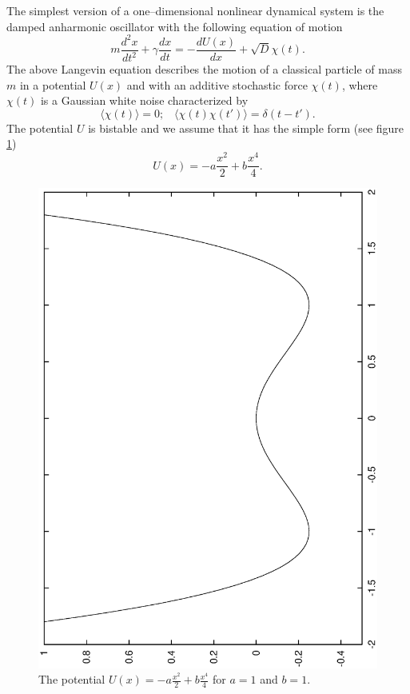 The simplest version of a one--dimensional nonlinear dynamical system 
is the damped anharmonic oscillator with the following equation of motion
\begin{equation}
m \frac{d^2x}{dt^2} + \gamma \frac{dx}{dt} = - \frac{dU(x)}{dx} 
 + \sqrt{D} \chi(t).
\end{equation}
The above Langevin equation describes the motion of a classical particle of
mass $m$ in a potential $U(x)$ and with an additive stochastic force
$\chi(t)$,
where $\chi(t)$
is a Gaussian white noise characterized by
\begin{equation}
\langle \chi(t) \rangle =0; \;\;\; \langle \chi(t) \chi(t')\rangle =
\delta(t - t').
\end{equation}
The potential $U$ is bistable and we assume that it has the simple form
(see figure \ref{fig:BistablePotential})
\begin{equation}
U(x) = -a \frac{x^2}{2} + b \frac{x^4}{4}.
\end{equation}
\begin{figure}[htbp]
  \begin{center}
    \includegraphics[angle=-90,width=\textwidth]{Figures/BistablePotential.eps}
    \caption{The potential $U(x)=-a \frac{x^2}{2} + b \frac{x^4}{4}$ 
      for $a=1$ and $b=1$.}
    \label{fig:BistablePotential}
  \end{center}
\end{figure}
